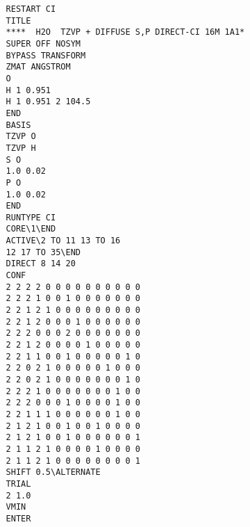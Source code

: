 \documentclass[11pt,fleqn]{article}
\begin{document}
{
\footnotesize
\begin{verbatim}
          RESTART CI
          TITLE  
          ****  H2O  TZVP + DIFFUSE S,P DIRECT-CI 16M 1A1*
          SUPER OFF NOSYM
          BYPASS TRANSFORM
          ZMAT ANGSTROM
          O
          H 1 0.951
          H 1 0.951 2 104.5
          END
          BASIS 
          TZVP O
          TZVP H
          S O
          1.0 0.02
          P O
          1.0 0.02
          END
          RUNTYPE CI
          CORE\1\END
          ACTIVE\2 TO 11 13 TO 16 
          12 17 TO 35\END
          DIRECT 8 14 20
          CONF
          2 2 2 2 0 0 0 0 0 0 0 0 0 0
          2 2 2 1 0 0 1 0 0 0 0 0 0 0
          2 2 1 2 1 0 0 0 0 0 0 0 0 0
          2 2 1 2 0 0 0 1 0 0 0 0 0 0
          2 2 2 0 0 0 2 0 0 0 0 0 0 0
          2 2 1 2 0 0 0 0 1 0 0 0 0 0
          2 2 1 1 0 0 1 0 0 0 0 0 1 0
          2 2 0 2 1 0 0 0 0 0 1 0 0 0
          2 2 0 2 1 0 0 0 0 0 0 0 1 0
          2 2 2 1 0 0 0 0 0 0 0 1 0 0
          2 2 2 0 0 0 1 0 0 0 0 1 0 0
          2 2 1 1 1 0 0 0 0 0 0 1 0 0
          2 1 2 1 0 0 1 0 0 1 0 0 0 0
          2 1 2 1 0 0 1 0 0 0 0 0 0 1
          2 1 1 2 1 0 0 0 0 1 0 0 0 0
          2 1 1 2 1 0 0 0 0 0 0 0 0 1
          SHIFT 0.5\ALTERNATE
          TRIAL
          2 1.0
          VMIN
          ENTER
\end{verbatim}
}

\clearpage
\end{document}
